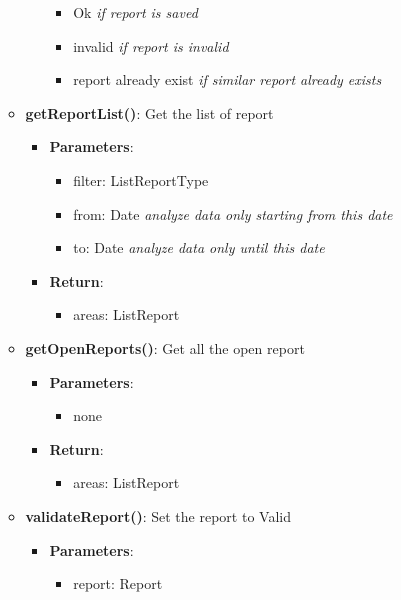 \documentclass{article}
\begin{document}
\begin{itemize}
\begin{itemize}
\begin{itemize}
\begin{itemize}
						\item Ok 		\textit{if report is saved}
						\item invalid 	\textit{if report is invalid}
						\item report already exist \textit{if similar report already exists}
					\end{itemize}
			\end{itemize}
			\item \textbf{getReportList()}:
				Get the list of report
				\begin{itemize}
					\item \textbf{Parameters}:
						\begin{itemize}
							\item filter: List\textlangle{}ReportType\textrangle{}
							\item from: Date \textit{analyze data only starting from this date}
							\item to: Date \textit{analyze data only until this date}
						\end{itemize}
					\item \textbf{Return}:
						\begin{itemize}
							\item areas: List\textlangle{}Report\textrangle{}
						\end{itemize}
				\end{itemize}
			\item \textbf{getOpenReports()}:
				Get all the open report
				\begin{itemize}
					\item \textbf{Parameters}:
						\begin{itemize}
							\item none
						\end{itemize}
					\item \textbf{Return}:
						\begin{itemize}
							\item areas: List\textlangle{}Report\textrangle{}
						\end{itemize}
				\end{itemize}
			\item \textbf{validateReport()}:
				Set the report to Valid
				\begin{itemize}
					\item \textbf{Parameters}:
						\begin{itemize}
							\item report: Report
						\end{itemize}

\end{itemize}
\end{itemize}
\end{itemize}
\end{document}

